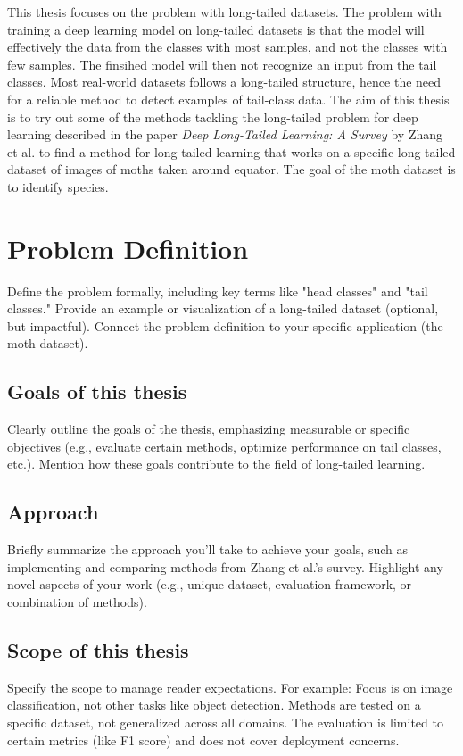 \label{sec:introduction}
This thesis focuses on the problem with long-tailed datasets. The problem with training a deep learning model on long-tailed datasets is that the model will effectively 
the data from the classes with most samples, and not the classes with few samples. The finsihed model will then not recognize an input from the tail classes. Most real-world
datasets follows a long-tailed structure, hence the need for a reliable method to detect examples of tail-class data. The aim of this thesis is to try out some of the
 methods tackling the long-tailed problem for deep learning described in the paper \textit{Deep Long-Tailed Learning: A Survey} by Zhang et al.\cite{zhang2023deep} to find a method for long-tailed
 learning that works on a specific long-tailed dataset of images of moths taken around equator. The goal of the moth dataset is to identify species.



\section{Problem Definition}
Define the problem formally, including key terms like "head classes" and "tail classes."
Provide an example or visualization of a long-tailed dataset (optional, but impactful).
Connect the problem definition to your specific application (the moth dataset).

\subsection{Goals of this thesis}
Clearly outline the goals of the thesis, emphasizing measurable or specific objectives (e.g., evaluate certain methods, optimize performance on tail classes, etc.).
Mention how these goals contribute to the field of long-tailed learning.

\subsection{Approach}
Briefly summarize the approach you’ll take to achieve your goals, such as implementing and comparing methods from Zhang et al.’s survey.
Highlight any novel aspects of your work (e.g., unique dataset, evaluation framework, or combination of methods).

\subsection{Scope of this thesis}
Specify the scope to manage reader expectations. For example:
Focus is on image classification, not other tasks like object detection.
Methods are tested on a specific dataset, not generalized across all domains.
The evaluation is limited to certain metrics (like F1 score) and does not cover deployment concerns.

